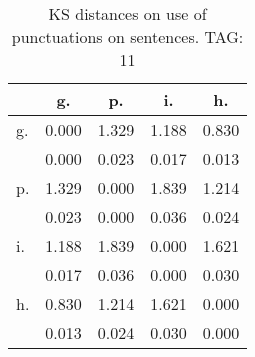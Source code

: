 \begin{table}[h!]
\begin{center}
\begin{tabular}{| l | c | c | c | c |}\hline
 & g. & p. & i. & h. \\\hline
g. & 0.000  & 1.329  & 1.188  & 0.830 \\\hline
 & 0.000  & 0.023  & 0.017  & 0.013 \\\hline
p. & 1.329  & 0.000  & 1.839  & 1.214 \\\hline
 & 0.023  & 0.000  & 0.036  & 0.024 \\\hline
i. & 1.188  & 1.839  & 0.000  & 1.621 \\\hline
 & 0.017  & 0.036  & 0.000  & 0.030 \\\hline
h. & 0.830  & 1.214  & 1.621  & 0.000 \\\hline
 & 0.013  & 0.024  & 0.030  & 0.000 \\\hline
\end{tabular}
\caption{KS distances on use of punctuations on sentences. TAG: 11}
\end{center}
\end{table}